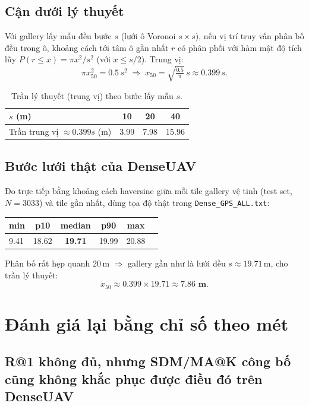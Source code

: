 \documentclass[11pt]{article}
\begin{document}
\subsection{Cận dưới lý thuyết}
Với gallery lấy mẫu đều bước $s$ (lưới ô Voronoi $s\times s$), nếu vị trí truy vấn phân bố đều trong ô, khoảng cách tới tâm ô gần nhất $r$ có phân phối với hàm mật độ tích lũy $P(r \le x) = \pi x^2 / s^2$ (với $x \le s/2$). Trung vị:
$$
\pi x_{50}^2 = 0.5\, s^2 \;\Rightarrow\; x_{50} = \sqrt{\tfrac{0.5}{\pi}}\, s \approx 0.399\, s.
$$

\begin{table}[h]
\centering
\caption{Trần lý thuyết (trung vị) theo bước lấy mẫu $s$.}
\begin{tabular}{lccc}
\toprule
$s$ (m) & 10 & 20 & 40 \\
\midrule
Trần trung vị $\approx 0.399s$ (m) & 3.99 & 7.98 & 15.96 \\
\bottomrule
\end{tabular}
\end{table}

\subsection{Bước lưới thật của DenseUAV}
Đo trực tiếp bằng khoảng cách haversine giữa mỗi tile gallery vệ tinh (test set, $N=3033$) và tile gần nhất, dùng tọa độ thật trong \texttt{Dense\_GPS\_ALL.txt}:

\begin{center}
\begin{tabular}{lccccc}
\toprule
min & p10 & \textbf{median} & p90 & max \\
\midrule
9.41 & 18.62 & \textbf{19.71} & 19.99 & 20.88 \\
\bottomrule
\end{tabular}
\end{center}

Phân bố rất hẹp quanh 20\,m $\Rightarrow$ gallery gần như là lưới đều $s\approx19.71$\,m, cho trần lý thuyết:
$$
x_{50} \approx 0.399 \times 19.71 \approx \mathbf{7.86\text{ m}}.
$$

\section{Đánh giá lại bằng chỉ số theo mét}

\subsection{R@1 không đủ, nhưng SDM/MA@K công bố cũng không khắc phục được điều đó trên DenseUAV}
\end{document}
